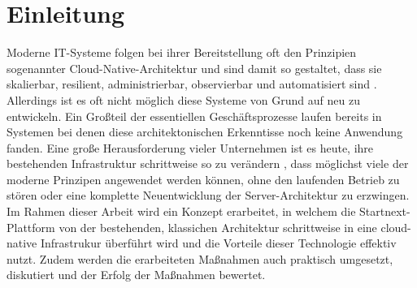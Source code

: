 \documentclass[11pt]{scrartcl}
\begin{document}
\section{Einleitung}

Moderne IT-Systeme folgen bei ihrer Bereitstellung oft den Prinzipien sogenannter \glqq Cloud-Native-Architektur\grqq{} 
und sind damit so gestaltet, dass sie skalierbar, resilient, administrierbar, observierbar und automatisiert sind \cite{Lee:2021}. 
Allerdings ist es oft nicht möglich diese Systeme von Grund auf neu zu entwickeln. Ein Großteil der essentiellen Geschäftsprozesse 
laufen bereits in Systemen bei denen diese architektonischen Erkenntisse noch keine Anwendung fanden. Eine große Herausforderung vieler 
Unternehmen ist es heute, ihre bestehenden Infrastruktur schrittweise so zu verändern \cite{Fiedelholtz:2021}, dass möglichst viele der 
moderne Prinzipen angewendet werden können, ohne den laufenden Betrieb zu stören oder eine komplette Neuentwicklung der Server-Architektur 
zu erzwingen. Im Rahmen dieser Arbeit wird ein Konzept erarbeitet, in welchem die Startnext-Plattform von der bestehenden, klassichen Architektur 
schrittweise in eine cloud-native Infrastrukur überführt wird und die Vorteile dieser Technologie effektiv nutzt. Zudem werden die erarbeiteten 
Maßnahmen auch praktisch umgesetzt, diskutiert und der Erfolg der Maßnahmen bewertet.

\end{document}

